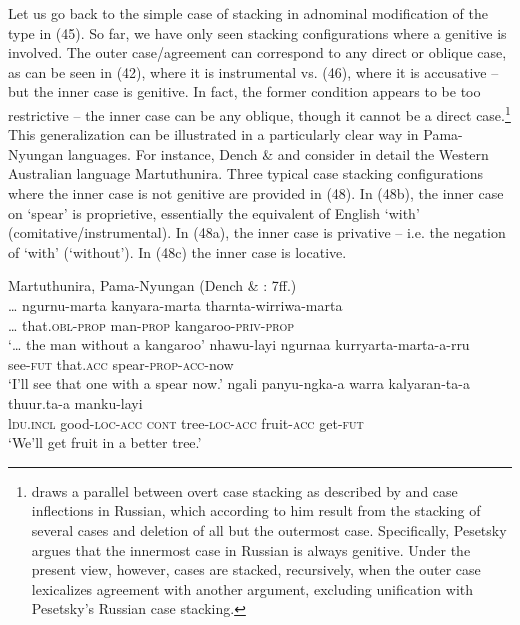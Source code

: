 \documentclass[output=paper]{langsci/langscibook}
\begin{document}
Let us go back to the simple case of stacking in adnominal modification of the type in (45). So far, we have only seen stacking configurations where a genitive is involved. The outer case/agreement can correspond to any direct or oblique case, as can be seen in (42), where it is instrumental vs. (46), where it is accusative – but the inner case is genitive. In fact, the former condition appears to be too restrictive – the inner case can be any oblique, though it cannot be a direct case.\footnote{\citet{Pesetsky2013} draws a parallel between overt case stacking as described by \citet{Richards2013} and case inflections in Russian, which according to him result from the stacking of several cases and deletion of all but the outermost case. Specifically, Pesetsky argues that the innermost case in Russian is always genitive. Under the present view, however, cases are stacked, recursively, when the outer case lexicalizes agreement with another argument, excluding unification with Pesetsky’s Russian case stacking.}  This generalization can be illustrated in a particularly clear way in Pama-Nyungan languages. For instance, Dench \& \citet{Evans1988} and \citet{Dench1995} consider in detail the Western Australian language Martuthunira. Three typical case stacking configurations where the inner case is not genitive are provided in (48). In (48b), the inner case on ‘spear’ is proprietive, essentially the equivalent of English ‘with’ (comitative/instrumental). In (48a), the inner case is privative – i.e. the negation of ‘with’ (‘without’). In (48c) the inner case is locative. 

\ea%
    Martuthunira, Pama-Nyungan (Dench \& \citealt{Evans1988}: 7ff.)\label{ex:manzini:48}\\
    \ea
    \gll … ngurnu-marta   kanyara-marta  tharnta-wirriwa-marta    \\
         … that.\textsc{obl-prop}   man-\textsc{prop}   kangaroo-\textsc{priv-prop}\\
    \glt ‘… the man without a kangaroo’
    \ex  
    \gll  nhawu-layi   ngurnaa  kurryarta-marta-a-rru    \\
         see-\textsc{fut}   that.\textsc{acc}   spear-\textsc{prop-acc}{}-now\\
    \glt ‘I'll see that one with a spear now.’
    \ex  
    \gll ngali   panyu-ngka-a   warra  kalyaran-ta-a   thuur.ta-a   manku-layi\\
         l\textsc{du.incl}   good-\textsc{loc-acc  cont}   tree-\textsc{loc-acc}   fruit-\textsc{acc}   get-\textsc{fut}\\
    \glt ‘We'll get fruit in a better tree.’ 
    \z
\z 
\end{document}
